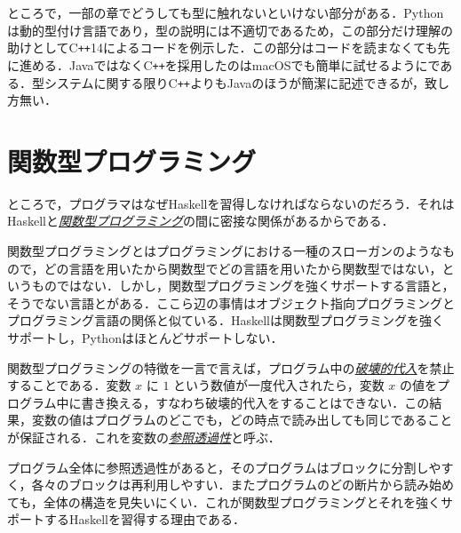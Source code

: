 \documentclass[a4paper]{jsbook}
\newcommand{\programminglanguage}[1]{\textsf{#1}}
\newcommand{\cxx}{\programminglanguage{C}\texttt{++}}
\newcommand{\cxxfourteen}{\cxx\programminglanguage{14}}
\newcommand{\haskell}{\programminglanguage{Haskell}}
\newcommand{\java}{\programminglanguage{Java}}
\newcommand{\python}{\programminglanguage{Python}}
\newcommand{\keyword}[1]{{\underline{\emph{#1}}}}
\begin{document}
ところで，一部の章でどうしても型に触れないといけない部分がある．\python は動的型付け言語であり，型の説明には不適切であるため，この部分だけ理解の助けとして\cxxfourteen によるコードを例示した．この部分はコードを読まなくても先に進める．\java ではなく\cxx を採用したのはmacOSでも簡単に試せるようにである．型システムに関する限り\cxx よりも\java のほうが簡潔に記述できるが，致し方無い．

\section{関数型プログラミング}

ところで，プログラマはなぜ\haskell を習得しなければならないのだろう．それは\haskell と\keyword{関数型プログラミング}の間に密接な関係があるからである．

関数型プログラミングとはプログラミングにおける一種のスローガンのようなもので，どの言語を用いたから関数型でどの言語を用いたから関数型ではない，というものではない．しかし，関数型プログラミングを強くサポートする言語と，そうでない言語とがある．ここら辺の事情はオブジェクト指向プログラミングとプログラミング言語の関係と似ている．\haskell は関数型プログラミングを強くサポートし，\python はほとんどサポートしない．

関数型プログラミングの特徴を一言で言えば，プログラム中の\keyword{破壊的代入}を禁止することである．変数 $x$ に $1$ という数値が一度代入されたら，変数 $x$ の値をプログラム中に書き換える，すなわち破壊的代入をすることはできない．この結果，変数の値はプログラムのどこでも，どの時点で読み出しても同じであることが保証される．これを変数の\keyword{参照透過性}と呼ぶ．

プログラム全体に参照透過性があると，そのプログラムはブロックに分割しやすく，各々のブロックは再利用しやすい．またプログラムのどの断片から読み始めても，全体の構造を見失いにくい．これが関数型プログラミングとそれを強くサポートする\haskell を習得する理由である．



\end{document}

